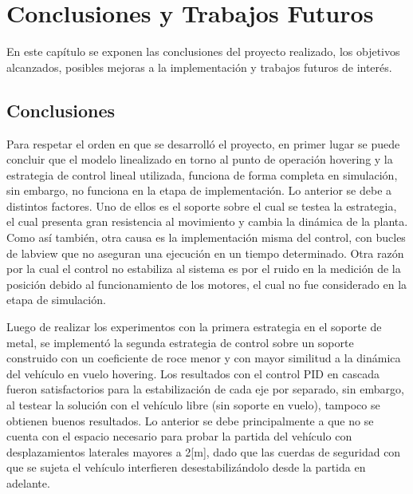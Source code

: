\documentclass[\main/main.tex]{subfiles}
\begin{document}
\chapter{Conclusiones y Trabajos Futuros}

En este capítulo se exponen las conclusiones del proyecto realizado, los objetivos alcanzados, posibles mejoras a la implementación y trabajos futuros de interés.

\section{Conclusiones}

Para respetar el orden en que se desarrolló el proyecto, en primer lugar se puede concluir que el modelo linealizado en torno al punto de operación hovering y la estrategia de control lineal utilizada, funciona de forma completa en simulación, sin embargo, no funciona en la etapa de implementación. Lo anterior se debe a distintos factores. Uno de ellos es el soporte sobre el cual se testea la estrategia, el cual presenta gran resistencia al movimiento y cambia la dinámica de la planta. Como así también, otra causa es la implementación misma del control, con bucles de labview que no aseguran una ejecución en un tiempo determinado. Otra razón por la cual el control no estabiliza al sistema es por el ruido en la medición de la posición debido al funcionamiento de los motores, el cual no fue considerado en la etapa de simulación.

\hfill \break

Luego de realizar los experimentos con la primera estrategia en el soporte de metal, se implementó la segunda estrategia de control sobre un soporte construido con un coeficiente de roce menor y con mayor similitud a la dinámica del vehículo en vuelo hovering. Los resultados con el control PID en cascada fueron satisfactorios para la estabilización de cada eje por separado, sin embargo, al testear la solución con el vehículo libre (sin soporte en vuelo), tampoco se obtienen buenos resultados. Lo anterior se debe principalmente a que no se cuenta con el espacio necesario para probar la partida del vehículo con desplazamientos laterales mayores a 2[m], dado que las cuerdas de seguridad con que se sujeta el vehículo interfieren desestabilizándolo desde la partida en adelante.

\hfill \break
\end{document}
